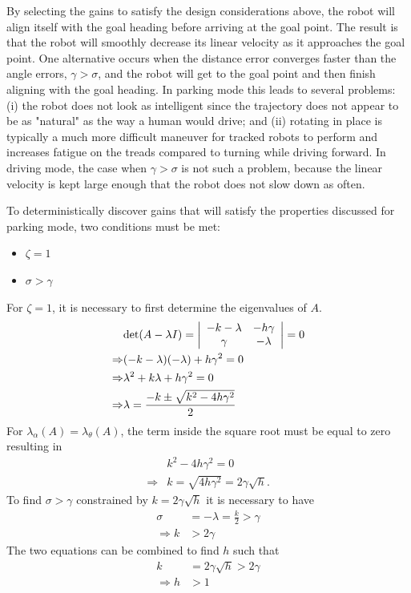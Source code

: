 By selecting the gains to satisfy the design considerations above, the robot will align itself with the goal heading before arriving at the goal point. The result is that the robot will smoothly decrease its linear velocity as it approaches the goal point. One alternative occurs when the distance error converges faster than the angle errors, $\gamma>\sigma$, and the robot will get to the goal point and then finish aligning with the goal heading. In parking mode this leads to several problems: (i) the robot does not look as intelligent since the trajectory does not appear to be as "natural" as the way a human would drive; and (ii) rotating in place is typically a much more difficult maneuver for tracked robots to perform and increases fatigue on the treads compared to turning while driving forward. In driving mode, the case when $\gamma>\sigma$ is not such a problem, because the linear velocity is kept large enough that the robot does not slow down as often.

To deterministically discover gains that will satisfy the properties discussed for parking mode, two conditions must be met:
\begin{itemize}
\item $\zeta = 1$
\item $\sigma > \gamma$
\end{itemize}
For $\zeta=1$, it is necessary to first determine the eigenvalues of $A$.
\begin{align*}
&\text{det}(A-\lambda I) = \left|\begin{array}{c c} -k-\lambda & -h\gamma \\ \gamma & -\lambda\end{array}\right| = 0 \\
\Rightarrow &(-k-\lambda)(-\lambda)+h\gamma^2 = 0 \\
\Rightarrow &\lambda^2 + k\lambda + h\gamma^2 = 0 \\
\Rightarrow &\lambda = \frac{-k\pm\sqrt{k^2-4h\gamma^2}}{2}
\end{align*}
For $\lambda_\alpha(A)=\lambda_\theta(A)$, the term inside the square root must be equal to zero resulting in
\begin{align*}
&k^2 - 4h\gamma^2 = 0 \\
\Rightarrow &k = \sqrt{4h\gamma^2} = 2\gamma\sqrt{h}.
\end{align*}
To find $\sigma>\gamma$ constrained by $k=2\gamma\sqrt{h}$ it is necessary to have
\begin{align*}
\sigma &= -\lambda = \tfrac{k}{2} > \gamma \\
\Rightarrow k &> 2\gamma
\end{align*}
The two equations can be combined to find $h$ such that
\begin{align*}
k &= 2\gamma\sqrt{h} > 2\gamma \\
\Rightarrow h &> 1
\end{align*}

